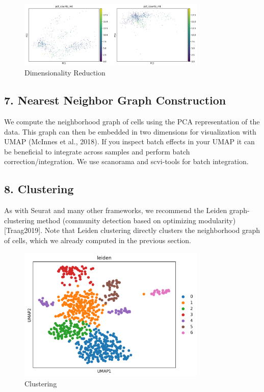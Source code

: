 \documentclass[12pt]{article}
\begin{document}
\begin{figure}[H]
    \centering
    \includegraphics[width=0.8\textwidth]{pca_metrics.png}
    \caption{Dimensionality Reduction}
    \label{fig:pca_metrics}
\end{figure}

\subsection{7. Nearest Neighbor Graph Construction}
We compute the neighborhood graph of cells using the PCA representation of the data. This graph can then be embedded in two dimensions for visualization with UMAP (McInnes et al., 2018). If you inspect batch effects in your UMAP it can be beneficial to integrate across samples and perform batch correction/integration. We use scanorama and scvi-tools for batch integration.

\subsection{8. Clustering}
As with Seurat and many other frameworks, we recommend the Leiden graph-clustering method (community detection based on optimizing modularity) [Traag2019]. Note that Leiden clustering directly clusters the neighborhood graph of cells, which we already computed in the previous section.

\begin{figure}[H]
    \centering
    \includegraphics[width=0.8\textwidth]{umap_clusters.png}
    \caption{Clustering}
    \label{fig:umap_clusters}
\end{figure}
\end{document}
